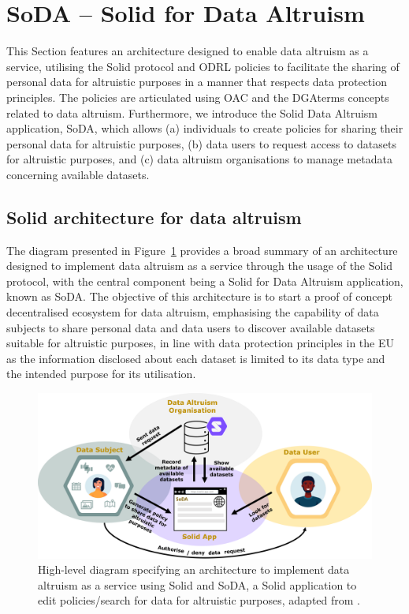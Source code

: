 \section{SoDA -- Solid for Data Altruism}
\label{sec:soda}

This Section features an architecture designed to enable data altruism as a service, utilising the Solid protocol and ODRL policies to facilitate the sharing of personal data for altruistic purposes in a manner that respects data protection principles.
The policies are articulated using OAC and the DGAterms concepts related to data altruism.
Furthermore, we introduce the Solid Data Altruism application, SoDA, which allows (a) individuals to create policies for sharing their personal data for altruistic purposes, (b) data users to request access to datasets for altruistic purposes, and (c) data altruism organisations to manage metadata concerning available datasets.

\subsection{Solid architecture for data altruism}
\label{sec:architecture_soda}

The diagram presented in Figure~\ref{fig:soda_architecture} provides a broad summary of an architecture designed to implement data altruism as a service through the usage of the Solid protocol, with the central component being a Solid for Data Altruism application, known as SoDA.
The objective of this architecture is to start a proof of concept decentralised ecosystem for data altruism, emphasising the capability of data subjects to share personal data and data users to discover available datasets suitable for altruistic purposes, in line with data protection principles in the EU as the information disclosed about each dataset is limited to its data type and the intended purpose for its utilisation.

\begin{figure}[ht]
  \centering
  \includegraphics[width=\linewidth]{figures/chapter-7/architecture.png}
  \caption[SoDA architecture diagram.]{High-level diagram specifying an architecture to implement data altruism as a service using Solid and SoDA, a Solid application to edit policies/search for data for altruistic purposes, adapted from \cite{esteves_towards_2023}.}
  \label{fig:soda_architecture}
\end{figure}

